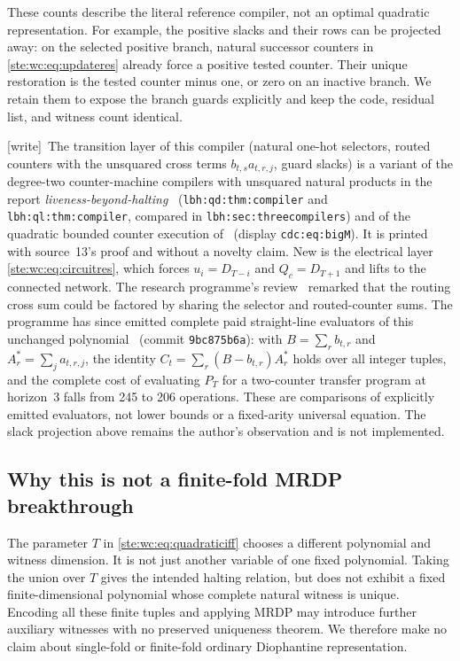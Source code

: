 \documentclass[11pt,letterpaper]{article}
\theoremstyle{definition}
\theoremstyle{remark}
\newcommand{\wtag}{\textup{[write]}}
\begin{document}
These counts describe the literal reference compiler, not an optimal
quadratic representation. For example, the positive slacks and their
rows can be projected away: on the selected positive branch, natural
successor counters in \eqref{ste:wc:eq:updateres} already force a positive tested
counter. Their unique restoration is the tested counter minus one, or
zero on an inactive branch. We retain them to expose the branch guards
explicitly and keep the code, residual list, and witness count identical.

\wtag\ The transition layer of this compiler (natural one-hot selectors, routed counters with the unsquared cross terms $b_{t,s}a_{t,r,j}$, guard slacks) is a variant of the degree-two counter-machine compilers with unsquared natural products in the report \emph{liveness-beyond-halting}~\cite{lbh} (\texttt{lbh:qd:thm:compiler} and \texttt{lbh:ql:thm:compiler}, compared in \texttt{lbh:sec:threecompilers}) and of the quadratic bounded counter execution of~\cite{cdc} (display \texttt{cdc:eq:bigM}). It is printed with source~13's proof and without a novelty claim. New is the electrical layer \eqref{ste:wc:eq:circuitres}, which forces $u_i=D_{T-i}$ and $Q_c=D_{T+1}$ and lifts to the connected network. The research programme's review~\cite{reviewCG} remarked that the routing cross sum could be factored by sharing the selector and routed-counter sums. The programme has since emitted complete paid straight-line evaluators of this unchanged polynomial~\cite{slpCG} (commit \texttt{9bc875b6a}): with $B=\sum_rb_{t,r}$ and $A^*_r=\sum_ja_{t,r,j}$, the identity $C_t=\sum_r(B-b_{t,r})A^*_r$ holds over all integer tuples, and the complete cost of evaluating $P_T$ for a two-counter transfer program at horizon~3 falls from 245 to 206 operations. These are comparisons of explicitly emitted evaluators, not lower bounds or a fixed-arity universal equation. The slack projection above remains the author's observation and is not implemented.

\subsection{Why this is not a finite-fold MRDP breakthrough}
The parameter $T$ in \eqref{ste:wc:eq:quadraticiff} chooses a different polynomial
and witness dimension. It is not just another variable of one fixed
polynomial. Taking the union over $T$ gives the intended halting relation,
but does not exhibit a fixed finite-dimensional polynomial whose complete
natural witness is unique. Encoding all these finite tuples and applying
MRDP may introduce further auxiliary witnesses with no preserved
uniqueness theorem. We therefore make no claim about single-fold or
finite-fold ordinary Diophantine representation.
\end{document}
